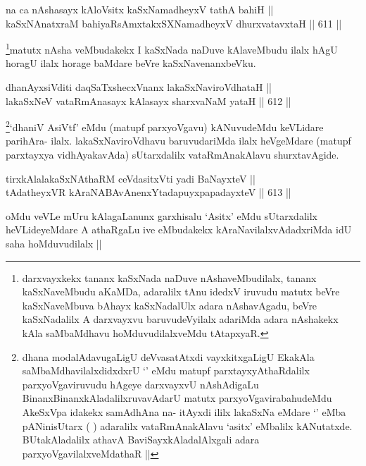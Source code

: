 \begin{shl}
na ca nAshasayx kAloV\s sitx kaSxNamadheyxV tathA bahiH || \\
kaSxNAnatxraM bahiyaRsAmxtakxSXNamadheyxV dhurxvatavxtaH ||  611 ||  
\end{shl}

\begin{artha}
\footnote{darxvayxkekx tananx kaSxNada naDuve nAshaveMbudilalx, tananx kaSxNaveMbudu aKaMDa, adaralilx tAnu idedxV iruvudu matutx beVre kaSxNaveMbuva bAhayx kaSxNadalUlx adara nAshavAgadu, beVre kaSxNadalilx A darxvayxvu baruvudeVyilalx adariMda adara nAshakekx kAla saMbaMdhavu hoMduvudilalxveMdu tAtapxyaR.}matutx nAsha veMbudakekx I kaSxNada naDuve kAlaveMbudu ilalx hAgU horagU ilalx horage baMdare beVre kaSxNavenanxbeVku.
\end{artha}


\begin{shl}
dhanAyxsiVditi daqSaTxshecxVnanx lakaSxNaviroVdhataH || \\
lakaSxNeV vataRmAnasayx kAlasayx sharxvaNaM yataH ||  612 ||  
\end{shl}

\begin{artha}
\footnote{dhana modalAdavugaLigU deVvasatAtxdi vayxkitxgaLigU EkakAla saMbaMdhavilalxdidxdxrU `\stext' eMdu matupf parxtayxyAthaRdalilx parxyoVgaviruvudu hAgeye darxvayxvU nAshAdigaLu BinanxBinanxkAladalilxruvavAdarU matutx parxyoVgavirabahudeMdu AkeSxVpa idakekx samAdhAna na- itAyxdi ililx lakaSxNa eMdare `\stext' eMba pANinisUtarx (  ) adaralilx vataRmAnakAlavu `asitx' eMbalilx kANutatxde. BUtakAladalilx athavA BaviSayxkAladalAlxgali adara parxyoVgavilalxveMdathaR ||}`dhaniV AsiVtf' eMdu (matupf parxyoVgavu) kANuvudeMdu keVLidare  parihAra- ilalx. lakaSxNaviroVdhavu baruvudariMda ilalx heVgeMdare (matupf parxtayxya vidhAyakavAda) sUtarxdalilx vataRmAnakAlavu shurxtavAgide.
\end{artha}

\begin{shl}
tirxkAlalakaSxNAthaRM ceVdasitxVti yadi BaNayxteV || \\
tAdatheyxVR kAraNABAvAnenxYtadapuyxpapadayxteV ||  613 ||  
\end{shl}

\begin{artha}
oMdu veVLe mUru kAlagaLanunx garxhisalu `Asitx' eMdu sUtarxdalilx heVLideyeMdare A athaRgaLu ive eMbudakekx kAraNavilalxvAdadxriMda idU saha hoMduvudilalx ||
\end{artha}

